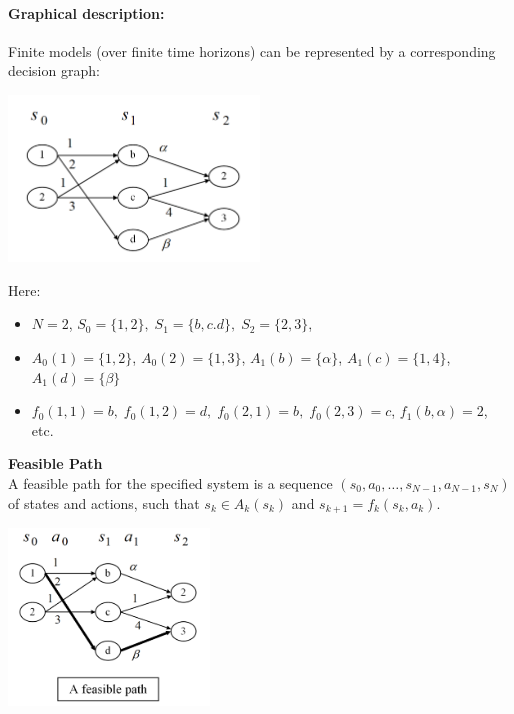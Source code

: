 \paragraph{Graphical description:} Finite models (over finite time horizons) can be represented by a corresponding decision graph:

\begin{centering}
\includegraphics[width=0.5\textwidth]{lecture2_decision_graph}\\
\end{centering}

Here:
\begin{itemize}
  \item $N = 2$, ${S_0} = \{ 1,2\} ,\;{S_1} = \{ b,c.d\} ,\;{S_2} = \{ 2,3\} $,
  \item ${A_0}(1) = \{ 1,2\} $, ${A_0}(2) = \{ 1,3\} $, ${A_1}(b) = \{ \alpha \} $, ${A_1}(c) = \{ 1,4\} $, ${A_1}(d) = \{ \beta \} $
  \item ${f_0}(1,1) = b,\;{f_0}(1,2) = d,\;{f_0}(2,1) = b,\;{f_0}(2,3) = c$, ${f_1}(b,\alpha ) = 2$, etc.
\end{itemize}

\begin{definition}{\textbf{Feasible Path}} \\
A feasible path for the specified system is a sequence $({s_0},{a_0}, \ldots ,{s_{N - 1}},{a_{N - 1}},{s_N})$ of states and actions, such that ${s_k} \in {A_k}({s_k})$ and ${s_{k + 1}} = {f_k}({s_k},{a_k})$.

\vspace{10pt}
\begin{centering}
\includegraphics[width=0.4\textwidth]{lecture2_feasible_path}\\
\end{centering}
\end{definition}

